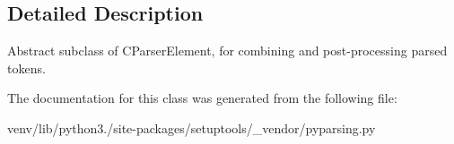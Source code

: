 \subsection{Detailed Description}
\begin{DoxyVerb}Abstract subclass of C{ParserElement}, for combining and post-processing parsed tokens.
\end{DoxyVerb}
 

The documentation for this class was generated from the following file\+:\begin{DoxyCompactItemize}
\item 
venv/lib/python3./site-\/packages/setuptools/\+\_\+vendor/pyparsing.\+py\end{DoxyCompactItemize}
